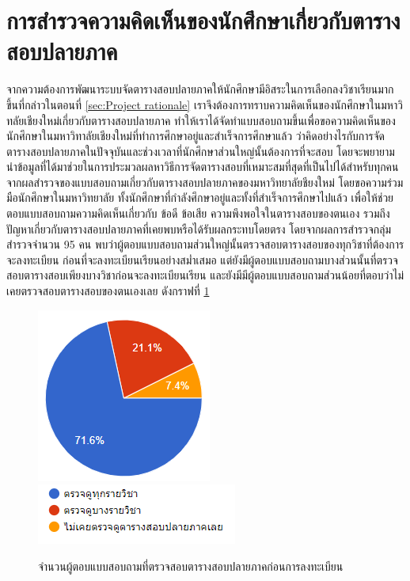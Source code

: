 \section{การสำรวจความคิดเห็นของนักศึกษาเกี่ยวกับตารางสอบปลายภาค}
จากความต้องการพัฒนาระบบจัดตารางสอบปลายภาคให้นักศึกษามีอิสระในการเลือกลงวิชาเรียนมากขึ้นที่กล่าวในตอนที่ \ref{sec:Project rationale} เราจึงต้องการทราบความคิดเห็นของนักศึกษาในมหาวิทลัยเชียงใหม่เกี่ยวกับตารางสอบปลายภาค 
ทำให้เราได้จัดทำแบบสอบถามขึ้นเพื่อขอความคิดเห็นของนักศึกษาในมหาวิทาลัยเชียงใหม่ที่ทำการศึกษาอยู่และสำเร็จการศึกษาแล้ว ว่าคิดอย่างไรกับการจัดตารางสอบปลายภาคในปัจจุบันและช่วงเวลาที่นักศึกษาส่วนใหญ่นั้นต้องการที่จะสอบ 
โดยจะพยายามนำข้อมูลที่ได้มาช่วยในการประมวลผลหาวิธีการจัดตารางสอบที่เหมาะสมที่สุดที่เป็นไปได้สำหรับทุกคน
\\จากผลสำรวจของแบบสอบถามเกี่ยวกับตารางสอบปลายภาคของมหาวิทยาลัยชียงใหม่ โดยขอความร่วมมือนักศึกษาในมหาวิทยาลัย
ทั้งนักศึกษาที่กำลังศึกษาอยู่และทั้งที่สำเร็จการศึกษาไปแล้ว เพื่อให้ช่วยตอบแบบสอบถามความคิดเห็นเกี่ยวกับ ข้อดี ข้อเสีย ความพึงพอใจในตารางสอบของตนเอง
รวมถึงปัญหาเกี่ยวกับตารางสอบปลายภาคที่เคยพบหรือได้รับผลกระทบโดยตรง โดยจากผลการสำรวจกลุ่มสำรวจจำนวน 95 คน พบว่าผู้ตอบแบบสอบถามส่วนใหญ่นั้นตรวจสอบตารางสอบของทุกวิชาที่ต้องการจะลงทะเบียน
ก่อนที่จะลงทะเบียนเรียนอย่างสม่ำเสมอ แต่ยังมีผู้ตอบแบบสอบถามบางส่วนนั้นที่ตรวจสอบตารางสอบเพียงบางวิชาก่อนจะลงทะเบียนเรียน และยังมีมีผู้ตอบแบบสอบถามส่วนน้อยที่ตอบว่าไม่เคยตรวจสอบตารางสอบของตนเองเลย ดังกราฟที่ \ref{fig:check_before_enrollment}
\begin{figure}
  \begin{center}
    \includegraphics{images/checking_schedule_before_enrollment.png}\\[2ex]
    \includegraphics{images/legend_for_checking_schedule_before_enrollment.png}
  \end{center}
  \caption[Poem]{จำนวนผู้ตอบแบบสอบถามที่ตรวจสอบตารางสอบปลายภาคก่อนการลงทะเบียน}
  \label{fig:check_before_enrollment}     
\end{figure}
